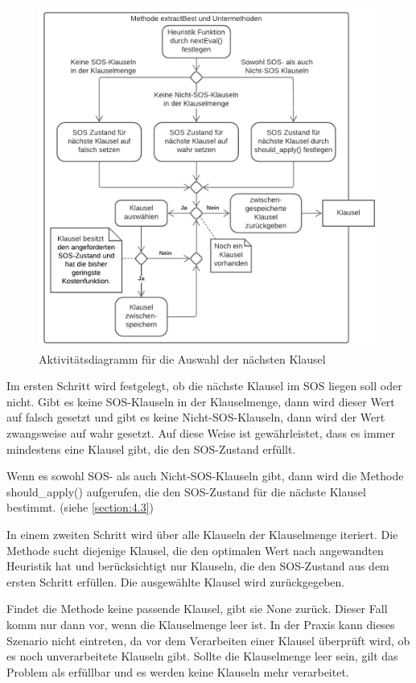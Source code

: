 \begin{figure}
	\centering
	\includegraphics[width=0.9\linewidth]{images/Lucid/SelectNext}
	\caption{Aktivitätsdiagramm für die Auswahl der nächsten Klausel}
	\label{fig:selectnext}
\end{figure}

Im ersten Schritt wird festgelegt, ob die nächste Klausel im SOS liegen soll oder nicht. Gibt es keine SOS-Klauseln in der Klauselmenge, dann wird dieser Wert auf falsch gesetzt und gibt es keine Nicht-SOS-Klauseln, dann wird der Wert zwangsweise auf wahr gesetzt. Auf diese Weise ist gewährleistet, dass es immer mindestens eine Klausel gibt, die den SOS-Zustand erfüllt. 

Wenn es sowohl SOS- als auch Nicht-SOS-Klauseln gibt, dann wird die Methode should\_apply() aufgerufen, die den SOS-Zustand für die nächste Klausel bestimmt. (siehe \ref{section:4.3})

In einem zweiten Schritt wird über alle Klauseln der Klauselmenge iteriert. Die Methode sucht diejenige Klausel, die den optimalen Wert nach angewandten Heuristik hat und berücksichtigt nur Klauseln, die den SOS-Zustand aus dem ersten Schritt erfüllen. Die ausgewählte Klausel wird zurückgegeben.

Findet die Methode keine passende Klausel, gibt sie None zurück. Dieser Fall komm nur dann vor, wenn die Klauselmenge leer ist. In der Praxis kann dieses Szenario nicht eintreten, da vor dem Verarbeiten einer Klausel überprüft wird, ob es noch unverarbeitete Klauseln gibt. Sollte die Klauselmenge leer sein, gilt das Problem als erfüllbar und es werden keine Klauseln mehr verarbeitet.



